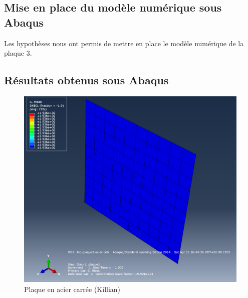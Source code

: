 \documentclass[a4paper,12pt]{article}
\begin{document}
\subsection{Mise en place du modèle numérique sous Abaqus}
Les hypothèses nous ont permis de mettre en place le modèle numérique de la plaque 3.

\subsection{Résultats obtenus sous Abaqus}



\begin{figure}[H]
	\centering
	\begin{minipage}{0.495\textwidth}
		\centering
		\includegraphics[width=\textwidth]{media/K_P3_mises_12042025.png} %
		\caption{Plaque en acier carrée (Killian)}
		\label{fig:image1}
	\end{minipage}
	\hfill
	\begin{minipage}{0.495\textwidth}
		\centering

\end{minipage}
\end{figure}
\end{document}
